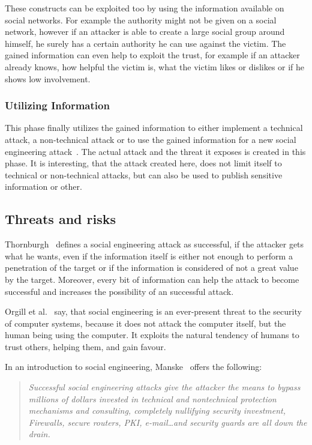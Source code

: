 These constructs can be exploited too by using the information available on
social networks. For example the authority might not be given on a social
network, however if an attacker is able to create a large social group around
himself, he surely has a certain authority he can use against the victim. The
gained information can even help to exploit the trust, for example if an
attacker already knows, how helpful the victim is, what the victim likes or
dislikes or if he shows low involvement.

\subsubsection{Utilizing Information}

This phase finally utilizes the gained information to either implement a
technical attack, a non-technical attack or to use the gained information for a
new social engineering attack~\cite{thornburgh2004}. The actual attack and the
threat it exposes is created in this phase. It is interesting, that the attack
created here, does not limit itself to technical or non-technical attacks, but
can also be used to publish sensitive information or other.

\subsection{Threats and risks}

Thornburgh~\cite{thornburgh2004} defines a social engineering attack as
successful, if the attacker gets what he wants, even if the information itself
is either not enough to perform a penetration of the target or if the
information is considered of not a great value by the target. Moreover, every
bit of information can help the attack to become successful and increases the
possibility of an successful attack.

Orgill et al.~\cite{orgill2004} say, that social engineering is an ever-present
threat to the security of computer systems, because it does not attack the
computer itself, but the human being using the computer. It exploits the
natural tendency of humans to trust others, helping them, and gain favour.

In an introduction to social engineering, Manske~\cite{manske2000} offers the following:

\begin{quote}
\textit{Successful social engineering attacks give the attacker the means to bypass
millions of dollars invested in technical and nontechnical protection
mechanisms and consulting, completely nullifying security investment,
Firewalls, secure routers, PKI, e-mail\dots and security guards are all down
the drain.}
\end{quote}

